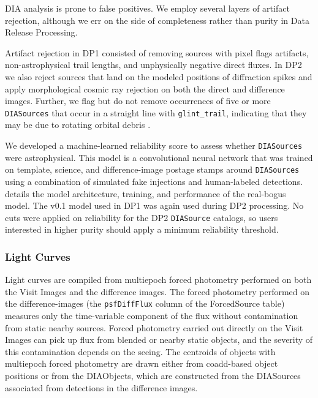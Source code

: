\gls{DIA} analysis is prone to false positives.
We employ several layers of artifact rejection, although we err on the side of completeness rather than purity in \gls{Data Release Processing}.

Artifact rejection in \gls{DP1} consisted of removing sources with pixel flags artifacts, non-astrophysical trail lengths, and unphysically negative direct fluxes.
In \gls{DP2} we also reject sources that land on the modeled positions of diffraction spikes and apply morphological cosmic ray rejection on both the direct and difference images.
Further, we flag but do not remove occurrences of five or more \texttt{DIASources} that occur in a straight line with \texttt{glint\_trail}, indicating that they may be due to rotating orbital debris \citep[][]{2022arXiv220205719K}.

We developed a machine-learned reliability score to assess whether \texttt{DIASources} were astrophysical.
This model is a convolutional neural network that was trained on template, science, and difference-image postage stamps around \texttt{DIASources} using a combination of simulated fake injections and human-labeled detections.
\citep[][]{DMTN-337} details the model architecture, training, and performance of the real-bogus model.
The v0.1 model used in \gls{DP1} was again used during \gls{DP2} processing.
No cuts were applied on reliability for the \gls{DP2} \texttt{DIASource} catalogs, so users interested in higher purity should apply a minimum reliability threshold.

\subsubsection{Light Curves} \label{sec:drp-variabletransient-lightcurves}

Light curves are compiled from multiepoch \gls{forced photometry} performed on both the \glspl{Visit Image} and the difference images.
The \gls{forced photometry} performed on the difference-images (the \texttt{psfDiffFlux} column of the \gls{ForcedSource} table) measures only the time-variable component of the flux without contamination from static nearby sources.
Forced photometry carried out directly on the \glspl{Visit Image} can pick up \gls{flux} from blended or nearby static objects, and the severity of this contamination depends on the seeing.
The centroids of objects with multiepoch \gls{forced photometry} are drawn either from coadd-based object positions or from the DIAObjects, which are constructed from the DIASources associated from detections in the difference images.

